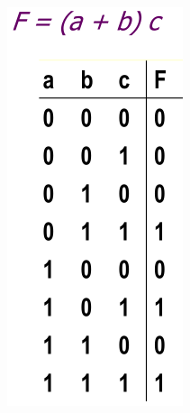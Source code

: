 \begin{figure}[H]
    \centering
    \begin{subfigure}[b]{0.15\textwidth}
        \includegraphics[width=\textwidth]{./Cap2/Images/Image04.png}

\end{subfigure}
\end{figure}
